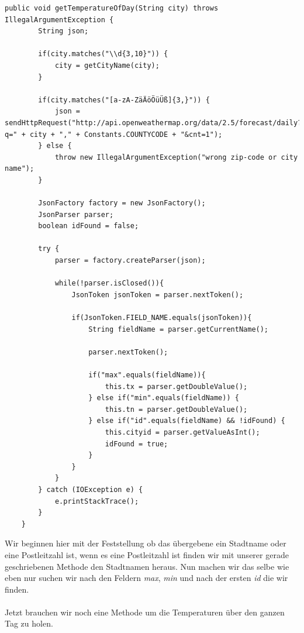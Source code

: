 \begin{lstlisting}
public void getTemperatureOfDay(String city) throws IllegalArgumentException {
        String json;

        if(city.matches("\\d{3,10}")) {
            city = getCityName(city);
        }

        if(city.matches("[a-zA-ZäÄöÖüÜß]{3,}")) {
            json = sendHttpRequest("http://api.openweathermap.org/data/2.5/forecast/daily?q=" + city + "," + Constants.COUNTYCODE + "&cnt=1");
        } else {
            throw new IllegalArgumentException("wrong zip-code or city name");
        }

        JsonFactory factory = new JsonFactory();
        JsonParser parser;
        boolean idFound = false;

        try {
            parser = factory.createParser(json);

            while(!parser.isClosed()){
                JsonToken jsonToken = parser.nextToken();

                if(JsonToken.FIELD_NAME.equals(jsonToken)){
                    String fieldName = parser.getCurrentName();

                    parser.nextToken();

                    if("max".equals(fieldName)){
                        this.tx = parser.getDoubleValue();
                    } else if("min".equals(fieldName)) {
                        this.tn = parser.getDoubleValue();
                    } else if("id".equals(fieldName) && !idFound) {
                        this.cityid = parser.getValueAsInt();
                        idFound = true;
                    }
                }
            }
        } catch (IOException e) {
            e.printStackTrace();
        }
    }
\end{lstlisting}

Wir beginnen hier mit der Feststellung ob das übergebene ein Stadtname oder eine Postleitzahl ist, wenn es eine Postleitzahl ist finden wir mit unserer gerade geschriebenen Methode den Stadtnamen heraus. Nun machen wir das selbe wie eben nur suchen wir nach den Feldern \textit{max}, \textit{min} und nach der ersten \textit{id} die wir finden.\\\\

Jetzt brauchen wir noch eine Methode um die Temperaturen über den ganzen Tag zu holen.

